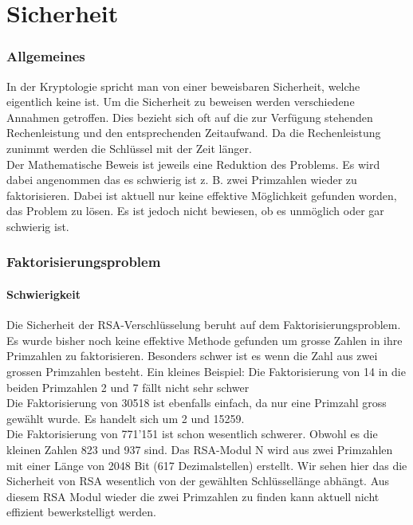 \part{Sicherheit}
\section{Allgemeines}
In der Kryptologie spricht man von einer beweisbaren Sicherheit, welche eigentlich keine ist. Um die Sicherheit zu beweisen werden verschiedene Annahmen getroffen. Dies bezieht sich oft auf die zur Verfügung stehenden Rechenleistung und den entsprechenden Zeitaufwand. Da die Rechenleistung zunimmt werden die Schlüssel mit der Zeit länger. \\
Der Mathematische Beweis ist jeweils eine Reduktion des Problems. Es wird dabei angenommen das es schwierig ist z. B. zwei Primzahlen wieder zu faktorisieren. Dabei ist aktuell nur keine effektive Möglichkeit gefunden worden, das Problem zu lösen. Es ist jedoch nicht bewiesen, ob es unmöglich oder gar schwierig ist.

\section{Faktorisierungsproblem}
\subsection{Schwierigkeit}
Die Sicherheit der RSA-Verschlüsselung beruht auf dem Faktorisierungsproblem. Es wurde bisher noch keine effektive Methode gefunden um grosse Zahlen in ihre Primzahlen zu faktorisieren. Besonders schwer ist es wenn die Zahl aus zwei grossen Primzahlen besteht. 
Ein kleines Beispiel:
Die Faktorisierung von 14 in die beiden Primzahlen 2 und 7 fällt nicht sehr schwer\\
Die Faktorisierung von 30518 ist ebenfalls einfach, da nur eine Primzahl gross gewählt wurde. Es handelt sich um 2 und 15259. \\
Die Faktorisierung von 771'151 ist schon wesentlich schwerer. Obwohl es die kleinen Zahlen 823 und 937 sind. Das RSA-Modul N wird aus zwei Primzahlen mit einer Länge von 2048 Bit (617 Dezimalstellen) erstellt. Wir sehen hier das die Sicherheit von RSA wesentlich von der gewählten Schlüssellänge abhängt. Aus diesem RSA Modul wieder die zwei Primzahlen zu finden kann aktuell nicht effizient bewerkstelligt werden.
%

